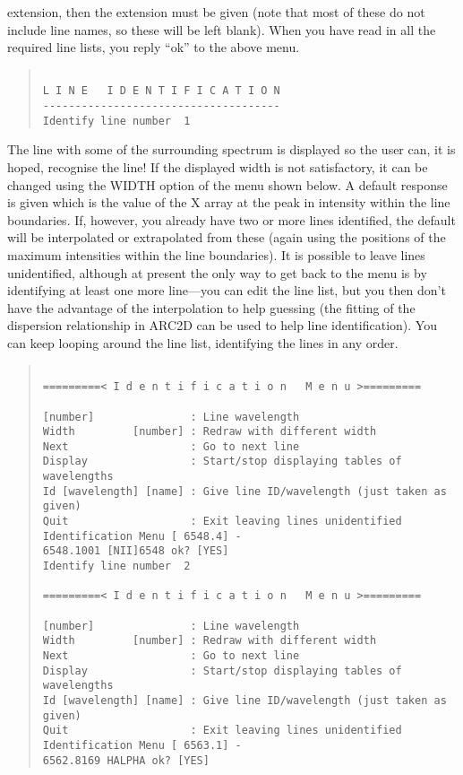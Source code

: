 extension, then the extension must be given (note that most of these do
not include line names, so these will be left blank).
When you have read in all the required line lists, you reply ``ok'' to
the above menu.
\begin{quote}\begin{verbatim}

L I N E   I D E N T I F I C A T I O N
-------------------------------------
Identify line number  1
\end{verbatim}\end{quote}
The line with some of the surrounding spectrum is displayed so the user
can, it is hoped, recognise the line!
If the displayed width is not satisfactory, it can be changed using the
WIDTH option of the menu shown below.
A default response is given which is the value of the X array at the
peak in intensity within the line boundaries.
If, however, you already have two or more lines identified, the default
will be interpolated or extrapolated from these (again using the
positions of the maximum intensities within the line boundaries).
It is possible to leave lines unidentified, although at present the only
way to get back to the menu is by identifying at least one more
line---you can edit the line list, but you then don't have the advantage
of the interpolation to help guessing (the fitting of the dispersion
relationship in ARC2D can be used to help line identification).
You can keep looping around the line list, identifying the lines in any
order.
\begin{quote}\begin{verbatim}
 
=========< I d e n t i f i c a t i o n   M e n u >=========
 
[number]               : Line wavelength
Width         [number] : Redraw with different width
Next                   : Go to next line
Display                : Start/stop displaying tables of wavelengths
Id [wavelength] [name] : Give line ID/wavelength (just taken as given)
Quit                   : Exit leaving lines unidentified
Identification Menu [ 6548.4] -
6548.1001 [NII]6548 ok? [YES]
Identify line number  2
 
=========< I d e n t i f i c a t i o n   M e n u >=========
 
[number]               : Line wavelength
Width         [number] : Redraw with different width
Next                   : Go to next line
Display                : Start/stop displaying tables of wavelengths
Id [wavelength] [name] : Give line ID/wavelength (just taken as given)
Quit                   : Exit leaving lines unidentified
Identification Menu [ 6563.1] -
6562.8169 HALPHA ok? [YES]
\end{verbatim}\end{quote}
